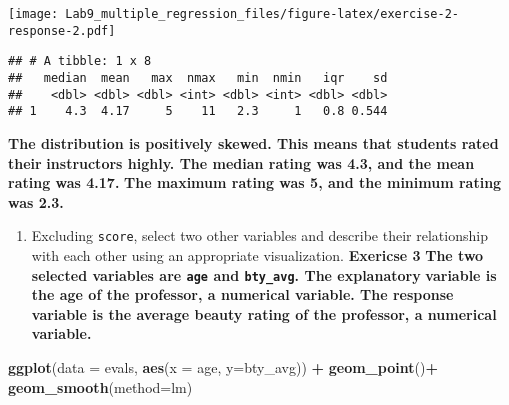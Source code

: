 \documentclass[
]{article}
\newenvironment{Shaded}{\begin{snugshade}}{\end{snugshade}}
\newcommand{\AttributeTok}[1]{\textcolor[rgb]{0.13,0.29,0.53}{#1}}
\newcommand{\FunctionTok}[1]{\textcolor[rgb]{0.13,0.29,0.53}{\textbf{#1}}}
\newcommand{\NormalTok}[1]{#1}
\newcommand{\SpecialCharTok}[1]{\textcolor[rgb]{0.81,0.36,0.00}{\textbf{#1}}}
\providecommand{\tightlist}{%
  \setlength{\itemsep}{0pt}\setlength{\parskip}{0pt}}
\begin{document}
\texttt{[image: Lab9\_multiple\_regression\_files/figure-latex/exercise-2-response-2.pdf]}

\begin{Shaded}
\end{Shaded}

\begin{verbatim}
## # A tibble: 1 x 8
##   median  mean   max  nmax   min  nmin   iqr    sd
##    <dbl> <dbl> <dbl> <int> <dbl> <int> <dbl> <dbl>
## 1    4.3  4.17     5    11   2.3     1   0.8 0.544
\end{verbatim}

\textbf{The distribution is positively skewed. This means that students
rated their} \textbf{instructors highly. The median rating was 4.3, and
the mean rating was 4.17.} \textbf{The maximum rating was 5, and the
minimum rating was 2.3.}

\begin{enumerate}
\def\labelenumi{\arabic{enumi}.}
\setcounter{enumi}{2}
\tightlist
\item
  Excluding \texttt{score}, select two other variables and describe
  their relationship with each other using an appropriate visualization.
  \textbf{Exericse 3} \textbf{The two selected variables are
  \texttt{age} and \texttt{bty\_avg}. The explanatory} \textbf{variable
  is the age of the professor, a numerical variable. The response}
  \textbf{variable is the average beauty rating of the professor, a
  numerical} \textbf{variable.}
\end{enumerate}

\begin{Shaded}
\begin{Highlighting}[]
\FunctionTok{ggplot}\NormalTok{(}\AttributeTok{data =}\NormalTok{ evals, }\FunctionTok{aes}\NormalTok{(}\AttributeTok{x =}\NormalTok{ age, }\AttributeTok{y=}\NormalTok{bty\_avg)) }\SpecialCharTok{+}
  \FunctionTok{geom\_point}\NormalTok{()}\SpecialCharTok{+}
  \FunctionTok{geom\_smooth}\NormalTok{(}\AttributeTok{method=}\NormalTok{lm)}
\end{Highlighting}
\end{Shaded}
\end{document}
